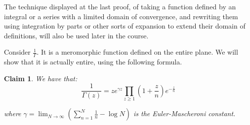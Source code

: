 \documentclass[11pt]{article} %
\newtheorem{claim}[theorem]{Claim}
\theoremstyle{definition}
\theoremstyle{remark}
\begin{document}
The technique displayed at the last proof, of taking a function defined by an integral or a series with a limited domain of convergence, and rewriting them using integration by parts or other sorts of expansion to extend their domain of definitions, will also be used later in the course.

Consider $\frac{1}{\Gamma}$. It is a meromorphic function defined on the entire plane. We will show that it is actually entire, using the following formula.

\begin{claim}
We have that:
\[ \frac{1}{\Gamma\left(z\right)} = ze^{\gamma z} \prod_{z \geq 1} \left(1+\frac{z}{n}\right)e^{-\frac{z}{n}}\]

where $\gamma = \lim_{N\to \infty} \left(\sum_{n=1}^N\frac{1}{n} - \log N\right)$ is the Euler-Mascheroni constant.  
\end{claim}
\end{document}
